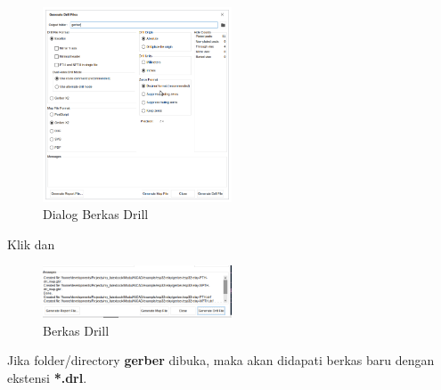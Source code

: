 \documentclass[12pt]{book}
\begin{document}
	\begin{figure}[!ht]
		\centering
		\includegraphics[width=0.5\textwidth]{images/fab/fab_6}
		\caption{Dialog Berkas Drill}
	\end{figure}

	Klik  dan 

	\newpage
	\begin{figure}[!ht]
		\centering
		\includegraphics[width=0.5\textwidth]{images/fab/fab_7}
		\caption{Berkas Drill}
	\end{figure}

	Jika folder/directory \textbf{gerber} dibuka, maka akan didapati berkas baru dengan ekstensi \textbf{*.drl}.
\end{document}
